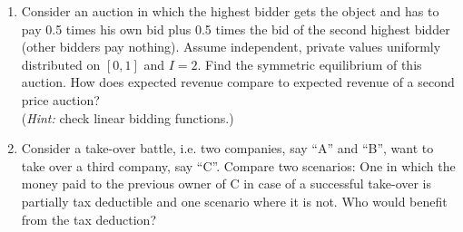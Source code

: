 \documentclass[a4paper,12pt]{article}
\begin{document}
\begin{enumerate}[resume]
\item Consider an auction in which the highest bidder gets the object and has to pay  0.5 times his own bid plus 0.5 times the bid of the second highest bidder (other bidders pay nothing). Assume independent, private values uniformly distributed on $[0,1]$ and $I=2$. Find the symmetric equilibrium of this auction. How does expected revenue compare to expected revenue of a second price auction?
  \\
  (\emph{Hint: }check linear bidding functions.)
\item Consider a take-over battle, i.e. two companies, say ``A'' and ``B'', want to take over a third company, say ``C''. Compare two scenarios: One in which the money paid to the previous owner of C in case of a successful take-over is partially tax deductible and one scenario where it is not. Who would benefit from the tax deduction?

\end{enumerate}
\end{document}
